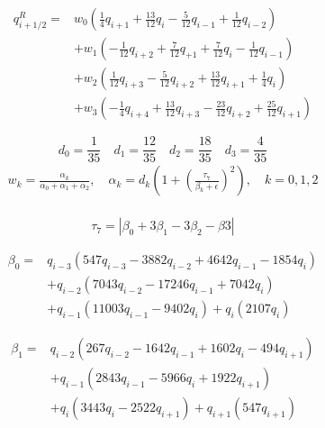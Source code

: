 \begin{equation}
\begin{aligned}
q_{i+1 / 2}^{R}=& w_{0}\left(\frac{1}{4} q_{i+1}+\frac{13}{12} q_{i}-\frac{5}{12} q_{i-1}+\frac{1}{12} q_{i-2}\right) \\
&+w_{1}\left(-\frac{1}{12} q_{i+2}+\frac{7}{12} q_{+1}+\frac{7}{12} q_{i}-\frac{1}{12} q_{i-1}\right) \\
&+w_{2}\left(\frac{1}{12} q_{i+3}-\frac{5}{12} q_{i+2}+\frac{13}{12} q_{i+1}+\frac{1}{4} q_{i}\right) \\
&+w_{3}\left(-\frac{1}{4} q_{i+4}+\frac{13}{12} q_{i+3}-\frac{23}{12} q_{i+2}+\frac{25}{12} q_{i+1}\right)
\end{aligned}
\end{equation}

$$d_0=\frac{1}{35} \quad d_1=\frac{12}{35} \quad d_2=\frac{18}{35} \quad d_3=\frac{4}{35}$$
\begin{equation}
\begin{array}{l}
w_{k}=\frac{\alpha_{k}}{\alpha_{0}+\alpha_{1}+\alpha_{2}}, \quad \alpha_{k}=d_k\left(1+\left(\frac{\tau_7}{\beta_{k}+\epsilon}\right)^2\right), \quad k=0,1,2\\
\end{array}
\end{equation}

\begin{equation}
\tau_7=\left|\beta_0+3\beta_1-3\beta_2-\beta3\right|
\end{equation}

\begin{equation}
\begin{aligned}
\beta_{0}=& q_{i-3}\left(547 q_{i-3}-3882 q_{i-2}+4642 q_{i-1}-1854 q_{i}\right) \\
&+q_{i-2}\left(7043 q_{i-2}-17246 q_{i-1}+7042 q_{i}\right) \\
&+q_{i-1}\left(11003 q_{i-1}-9402 q_{i}\right)+q_{i}\left(2107 q_{i}\right)
\end{aligned}
\end{equation}

\begin{equation}
\begin{aligned}
\beta_{1}=& q_{i-2}\left(267 q_{i-2}-1642 q_{i-1}+1602 q_{i}-494 q_{i+1}\right) \\
&+q_{i-1}\left(2843 q_{i-1}-5966 q_{i}+1922 q_{i+1}\right)\\
&+q_{i}\left(3443 q_{i}-2522 q_{i+1}\right)+q_{i+1}\left(547 q_{i+1}\right)
\end{aligned}
\end{equation}

